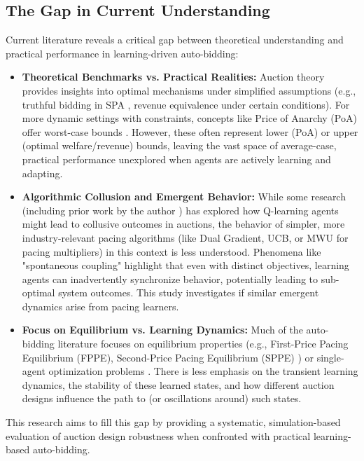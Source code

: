 \documentclass[12pt, a4paper]{article}
\begin{document}
\subsection{The Gap in Current Understanding}
Current literature reveals a critical gap between theoretical understanding and practical performance in learning-driven auto-bidding:
\begin{itemize}
    \item \textbf{Theoretical Benchmarks vs. Practical Realities:} Auction theory provides insights into optimal mechanisms under simplified assumptions (e.g., truthful bidding in SPA \cite{Vickrey1961}, revenue equivalence under certain conditions). For more dynamic settings with constraints, concepts like Price of Anarchy (PoA) offer worst-case bounds \cite{DengVarious}. However, these often represent lower (PoA) or upper (optimal welfare/revenue) bounds, leaving the vast space of average-case, practical performance unexplored when agents are actively learning and adapting.
    \item \textbf{Algorithmic Collusion and Emergent Behavior:} While some research (including prior work by the author \cite{Rawat2025AlgorithmicCollusion}) has explored how Q-learning agents might lead to collusive outcomes in auctions, the behavior of simpler, more industry-relevant pacing algorithms (like Dual Gradient, UCB, or MWU for pacing multipliers) in this context is less understood. Phenomena like "spontaneous coupling" \cite{BanchioMantegazza2022} highlight that even with distinct objectives, learning agents can inadvertently synchronize behavior, potentially leading to sub-optimal system outcomes. This study investigates if similar emergent dynamics arise from pacing learners.
    \item \textbf{Focus on Equilibrium vs. Learning Dynamics:} Much of the auto-bidding literature focuses on equilibrium properties (e.g., First-Price Pacing Equilibrium (FPPE), Second-Price Pacing Equilibrium (SPPE) \cite{Conitzer2021SPPE, Conitzer2022FPPE}) or single-agent optimization problems \cite{Aggarwal2019}. There is less emphasis on the transient learning dynamics, the stability of these learned states, and how different auction designs influence the path to (or oscillations around) such states.
\end{itemize}
This research aims to fill this gap by providing a systematic, simulation-based evaluation of auction design robustness when confronted with practical learning-based auto-bidding.
\end{document}
